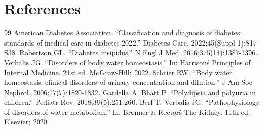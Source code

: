\section*{References}
\begin{thebibliography}{99}
 American Diabetes Association. ``Classification and diagnosis of diabetes: standards of medical care in diabetes-2022.'' Diabetes Care. 2022;45(Suppl 1):S17-S38.
 Robertson GL. ``Diabetes insipidus.'' N Engl J Med. 2016;375(14):1387-1396.
 Verbalis JG. ``Disorders of body water homeostasis.'' In: Harrison\'s Principles of Internal Medicine. 21st ed. McGraw-Hill; 2022.
 Schrier RW. ``Body water homeostasis: clinical disorders of urinary concentration and dilution.'' J Am Soc Nephrol. 2006;17(7):1820-1832.
 Gardella A, Bhatt P. ``Polydipsia and polyuria in children.'' Pediatr Rev. 2018;39(5):251-260.
 Berl T, Verbalis JG. ``Pathophysiology of disorders of water metabolism.'' In: Brenner \& Rector\'s The Kidney. 11th ed. Elsevier; 2020.
\end{thebibliography}
